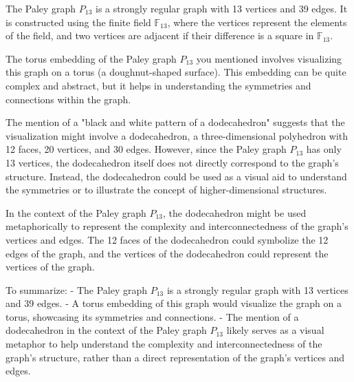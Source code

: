 The Paley graph \(P_{13}\) is a strongly regular graph with 13 vertices and 39 edges. It is constructed using the finite field \(\mathbb{F}_{13}\), where the vertices represent the elements of the field, and two vertices are adjacent if their difference is a square in \(\mathbb{F}_{13}\).

The torus embedding of the Paley graph \(P_{13}\) you mentioned involves visualizing this graph on a torus (a doughnut-shaped surface). This embedding can be quite complex and abstract, but it helps in understanding the symmetries and connections within the graph.

The mention of a "black and white pattern of a dodecahedron" suggests that the visualization might involve a dodecahedron, a three-dimensional polyhedron with 12 faces, 20 vertices, and 30 edges. However, since the Paley graph \(P_{13}\) has only 13 vertices, the dodecahedron itself does not directly correspond to the graph's structure. Instead, the dodecahedron could be used as a visual aid to understand the symmetries or to illustrate the concept of higher-dimensional structures.

In the context of the Paley graph \(P_{13}\), the dodecahedron might be used metaphorically to represent the complexity and interconnectedness of the graph's vertices and edges. The 12 faces of the dodecahedron could symbolize the 12 edges of the graph, and the vertices of the dodecahedron could represent the vertices of the graph.

To summarize:
- The Paley graph \(P_{13}\) is a strongly regular graph with 13 vertices and 39 edges.
- A torus embedding of this graph would visualize the graph on a torus, showcasing its symmetries and connections.
- The mention of a dodecahedron in the context of the Paley graph \(P_{13}\) likely serves as a visual metaphor to help understand the complexity and interconnectedness of the graph's structure, rather than a direct representation of the graph's vertices and edges.